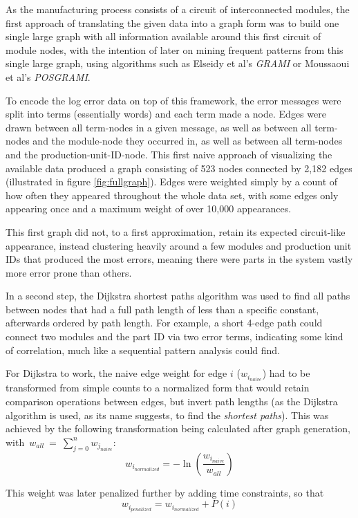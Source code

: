 \documentclass[pdftex,12pt,a4paper]{report}
\begin{document}
As the manufacturing process consists of a circuit of interconnected modules, the first approach of translating the given data into a graph form was to build one single large graph with all information available around this first circuit of module nodes, with the intention of later on mining frequent patterns from this single large graph, using algorithms such as Elseidy et al's \textit{GRAMI}\cite{Elseidy2014-fz} or Moussaoui et al's \textit{POSGRAMI}\cite{Moussaoui2016-ng}.

To encode the log error data on top of this framework, the error messages were split into terms (essentially words) and each term made a node. Edges were drawn between all term-nodes in a given message, as well as between all term-nodes and the module-node they occurred in, as well as between all term-nodes and the production-unit-ID-node. This first naive approach of visualizing the available data produced a graph consisting of 523 nodes connected by 2,182 edges (illustrated in figure \ref{fig:fullgraph}). Edges were weighted simply by a count of how often they appeared throughout the whole data set, with some edges only appearing once and a maximum weight of over 10,000 appearances.

This first graph did not, to a first approximation, retain its expected circuit-like appearance, instead clustering heavily around a few modules and production unit IDs that produced the most errors, meaning there were parts in the system vastly more error prone than others.

In a second step, the Dijkstra shortest paths algorithm was used to find all paths between nodes that had a full path length of less than a specific constant, afterwards ordered by path length. For example, a short 4-edge path could connect two modules and the part ID via two error terms, indicating some kind of correlation, much like a sequential pattern analysis could find.

For Dijkstra to work, the naive edge weight for edge $i$ ($w_{i_{naive}}$) had to be transformed from simple counts to a normalized form that would retain comparison operations between edges, but invert path lengths (as the Dijkstra algorithm is used, as its name suggests, to find the \emph{shortest paths}). This was achieved by the following transformation being calculated after graph generation, with~$w_{all}~=~\sum_{j=0}^{n} w_{j_{naive}}$:
\[w_{i_{normalized}} = -\ln \left( \frac{w_{i_{naive}}}{w_{all}} \right) \]

This weight was later penalized further by adding time constraints, so that
\[w_{i_{penalized}} = w_{i_{normalized}} + P(i)\]
\end{document}
